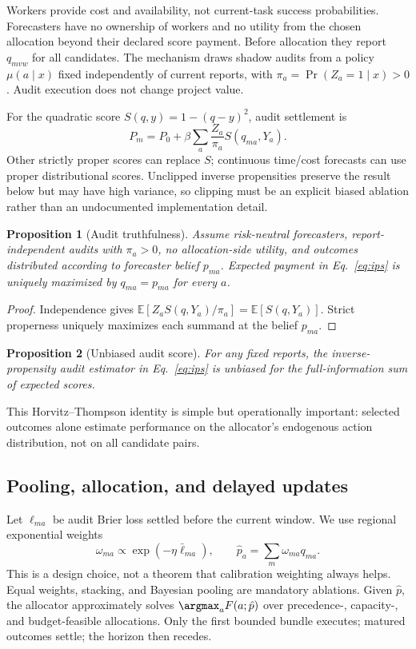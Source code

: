 \documentclass[sigconf,anonymous,review]{acmart}
\newtheorem{proposition}{Proposition}
\begin{document}
Workers provide cost and availability, not current-task success probabilities.
Forecasters have no ownership of workers and no utility from the chosen
allocation beyond their declared score payment. Before allocation they report
$q_{mvw}$ for all candidates. The mechanism draws shadow audits from a policy
$\mu(a\mid x)$ fixed independently of current reports, with
$\pi_{a}=\Pr(Z_a=1\mid x)>0$. Audit execution does not change project value.

For the quadratic score $S(q,y)=1-(q-y)^2$, audit settlement is
\begin{equation}\label{eq:ips}
P_m=P_0+\beta\sum_{a}\frac{Z_a}{\pi_a}S(q_{ma},Y_a).
\end{equation}
Other strictly proper scores can replace $S$; continuous time/cost forecasts can
use proper distributional scores. Unclipped inverse propensities preserve the
result below but may have high variance, so clipping must be an explicit biased
ablation rather than an undocumented implementation detail.

\begin{proposition}[Audit truthfulness]\label{prop:truth}
Assume risk-neutral forecasters, report-independent audits with $\pi_a>0$, no
allocation-side utility, and outcomes distributed according to forecaster belief
$p_{ma}$. Expected payment in Eq.~\eqref{eq:ips} is uniquely maximized by
$q_{ma}=p_{ma}$ for every $a$.
\end{proposition}
\begin{proof}
Independence gives
$\mathbb{E}[Z_a S(q,Y_a)/\pi_a]=\mathbb{E}[S(q,Y_a)]$.
Strict properness uniquely maximizes each summand at the belief $p_{ma}$.
\end{proof}

\begin{proposition}[Unbiased audit score]\label{prop:unbiased}
For any fixed reports, the inverse-propensity audit estimator in
Eq.~\eqref{eq:ips} is unbiased for the full-information sum of expected scores.
\end{proposition}
This Horvitz--Thompson identity is simple but operationally important: selected
outcomes alone estimate performance on the allocator's endogenous action
distribution, not on all candidate pairs.

\subsection{Pooling, allocation, and delayed updates}

Let $\ell_{ma}$ be audit Brier loss settled before the current window. We use
regional exponential weights
\begin{equation}
\omega_{ma}\propto\exp(-\eta\bar\ell_{ma}),\qquad
\hat p_a=\sum_m\omega_{ma}q_{ma}.
\end{equation}
This is a design choice, not a theorem that calibration weighting always helps.
Equal weights, stacking, and Bayesian pooling are mandatory ablations. Given
$\hat p$, the allocator approximately solves $\argmax_a F(a;\hat p)$ over
precedence-, capacity-, and budget-feasible allocations. Only the first bounded
bundle executes; matured outcomes settle; the horizon then recedes.
\end{document}
